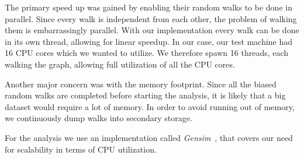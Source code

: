 The primary speed up was gained by enabling their random walks to be done in parallel. Since every walk is independent from each other, the problem of walking them is embarrassingly parallel. With our implementation every walk can be done in its own thread, allowing for linear speedup. In our case, our test machine had 16 CPU cores which we wanted to utilize. We therefore spawn 16 threads, each walking the graph, allowing full utilization of all the CPU cores.

Another major concern was with the memory footprint. Since all the biased random walks are completed before starting the analysis, it is likely that a big dataset would require a lot of memory. In order to avoid running out of memory, we continuously dump walks into secondary storage.

For the analysis we use an implementation called \emph{Gensim}~\cite{??}, that covers our need for scalability in terms of CPU utilization.
